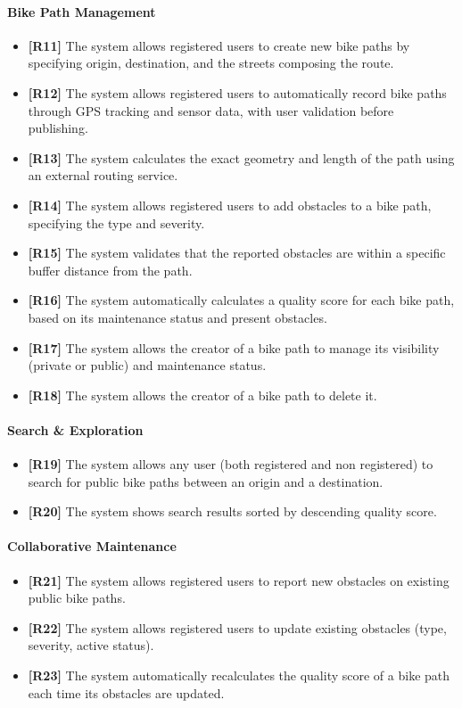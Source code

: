 \paragraph{Bike Path Management}
\begin{itemize}
    \item[] \textbf{[R11]} The system allows registered users to create new bike paths by specifying origin, destination, and the streets composing the route.
    \item[] \textbf{[R12]} The system allows registered users to automatically record bike paths through GPS tracking and sensor data, with user validation before publishing.
    \item[] \textbf{[R13]} The system calculates the exact geometry and length of the path using an external routing service.
    \item[] \textbf{[R14]} The system allows registered users to add obstacles to a bike path, specifying the type and severity.
    \item[] \textbf{[R15]} The system validates that the reported obstacles are within a specific buffer distance from the path.
    \item[] \textbf{[R16]} The system automatically calculates a quality score for each bike path, based on its maintenance status and present obstacles.
    \item[] \textbf{[R17]} The system allows the creator of a bike path to manage its visibility (private or public) and maintenance status.
    \item[] \textbf{[R18]} The system allows the creator of a bike path to delete it.
\end{itemize} 

\paragraph{Search \& Exploration}
\begin{itemize}
    \item[] \textbf{[R19]} The system allows any user (both registered and non registered) to search for public bike paths between an origin and a destination.
    \item[] \textbf{[R20]} The system shows search results sorted by descending quality score.
\end{itemize}

\paragraph{Collaborative Maintenance}
\begin{itemize}
    \item[] \textbf{[R21]} The system allows registered users to report new obstacles on existing public bike paths.
    \item[] \textbf{[R22]} The system allows registered users to update existing obstacles (type, severity, active status).
    \item[] \textbf{[R23]} The system automatically recalculates the quality score of a bike path each time its obstacles are updated.
\end{itemize}

